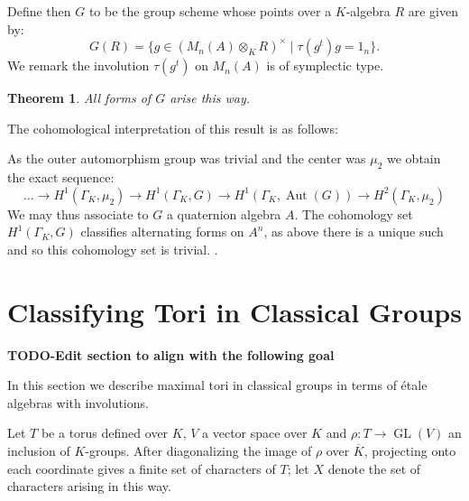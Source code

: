 \documentclass{article}
\theoremstyle{plain}
\newtheorem{theorem}{Theorem}[section]
\theoremstyle{definition}
\numberwithin{equation}{section}
\DeclareMathOperator{\Aut}{Aut}
\DeclareMathOperator{\GL}{GL}
\newcommand{\GalKbK}{\Gamma_K}
\newcommand{\Kb}{\overline{K}}
\newcommand{\TODO}[1]{\textbf{TODO-#1}}
\begin{document}
Define then $G$ to be the group scheme whose points over a $K$-algebra $R$ are given by:
\[ G(R) = \{ g\in (M_{n}(A) \otimes_K R)^\times \mid \tau(g^t)g = 1_n \}. \]
We remark the involution $\tau(g^t)$ on $M_{n}(A)$ is of symplectic type.

\begin{theorem}
All forms of $G$ arise this way.
\end{theorem}
\cite[TODO]{book of involutions}

The cohomological interpretation of this result is as follows:

As the outer automorphism group was trivial and the center was $\mu_2$ we obtain the exact sequence:
\[\ldots \rightarrow H^1(\GalKbK,\mu_2) \rightarrow  H^1(\GalKbK,G)  \rightarrow  H^1(\GalKbK, \Aut(G)) \rightarrow  H^2(\GalKbK, \mu_2)  \]
We may thus associate to $G$ a quaternion algebra $A$.
The cohomology set $H^1(\GalKbK,G) $ classifies alternating forms on $A^n$, as above there is a unique such and so this cohomology set is trivial.
\cite[TODO]{book of involutions}.



\section{Classifying Tori in Classical Groups}

\TODO{Edit section to align with the following goal}

In this section we describe maximal tori in classical groups in terms of \'etale algebras with involutions.

Let $T$ be a torus defined over $K$, $V$ a vector space over $K$ and $\rho : T \rightarrow \GL(V)$ an inclusion of $K$-groups.  After diagonalizing the image of $\rho$ over $\Kb$, projecting onto each coordinate gives a finite set of characters of $T$; let $X$ denote the set of characters arising in this way. 
\end{document}
